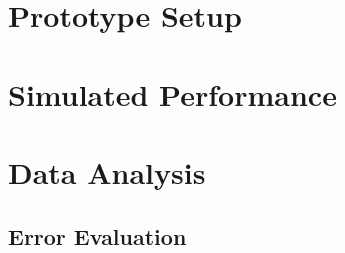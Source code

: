 \label{ch:analysis}

\section{Prototype Setup}

\section{Simulated Performance}

\section{Data Analysis}

\subsection{Error Evaluation}